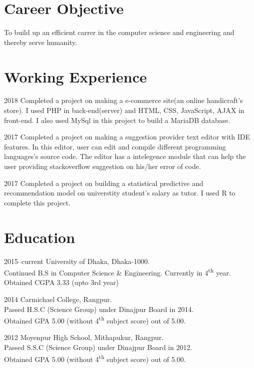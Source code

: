 \documentclass[a4paper]{article}
\begin{document}
\section{Career Objective}
\begin{CV}
\item To build up an efficient carrer in the computer science and engineering and thereby serve humanity.
  \end{CV}

\section{Working Experience}

\begin{CV}

\item[2018] Completed a project on making a e-commerce site(an online handicraft's store). I used PHP in back-end(server) and HTML, CSS, JavaScript, AJAX in front-end. I also used MySql in this project to build a MariaDB database.
\item[2017] Completed a project on making a suggestion provider text editor with IDE features. In this editor, user can edit and compile different programming languages's source code. The editor has a intelegence module that can help the user providing stackoverflow suggestion on his/her error of code.
\item[2017] Completed a project on building a statistical predictive and recommendation model on universtity student's salary as tutor. I used R to complete this project.
\end{CV}


\section{Education}

\begin{CV}
\item[2015--current] University of Dhaka, Dhaka-1000.\\Continued  B.S in Computer Science \& Engineering. Currently in 4\textsuperscript{th} year.\\Obtained CGPA 3.33 (upto 3rd year)
\item[2014] Carmichael College, Rangpur.\\Passed H.S.C (Science Group) under Dinajpur Board in 2014.\\Obtained GPA 5.00 (without 4\textsuperscript{th} subject score) out of 5.00.
\item[2012] Moyenpur High School, Mithapukur, Rangpur.\\Passed S.S.C (Science Group) under Dinajpur Board in 2012.\\Obtained GPA 5.00 (without 4\textsuperscript{th} subject score) out of 5.00.
\end{CV}
\end{document}
